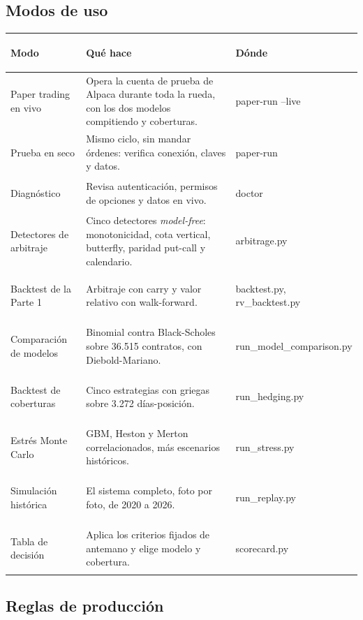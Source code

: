 \documentclass[11pt,a4paper]{article}
\begin{document}
\subsection{Modos de uso}

\begin{center}
\small
\begin{tabularx}{\linewidth}{@{}>{\sffamily\bfseries\raggedright\arraybackslash\leavevmode\color{navy}}p{3.2cm}X>{\ttfamily\scriptsize}p{4.2cm}@{}}
\toprule
\normalfont\sffamily\bfseries Modo & \sffamily\bfseries Qué hace & \normalfont\sffamily\bfseries Dónde \\
\midrule
Paper trading en vivo & Opera la cuenta de prueba de Alpaca durante toda la rueda, con los dos modelos compitiendo y coberturas. & paper-run --live \\
Prueba en seco & Mismo ciclo, sin mandar órdenes: verifica conexión, claves y datos. & paper-run \\
Diagnóstico & Revisa autenticación, permisos de opciones y datos en vivo. & doctor \\
Detectores de arbitraje & Cinco detectores \emph{model-free}: monotonicidad, cota vertical, butterfly, paridad put-call y calendario. & arbitrage.py \\
Backtest de la Parte 1 & Arbitraje con carry y valor relativo con walk-forward. & backtest.py, rv\_backtest.py \\
Comparación de modelos & Binomial contra Black-Scholes sobre 36.515 contratos, con Diebold-Mariano. & run\_model\_comparison.py \\
Backtest de coberturas & Cinco estrategias con griegas sobre 3.272 días-posición. & run\_hedging.py \\
Estrés Monte Carlo & GBM, Heston y Merton correlacionados, más escenarios históricos. & run\_stress.py \\
Simulación histórica & El sistema completo, foto por foto, de 2020 a 2026. & run\_replay.py \\
Tabla de decisión & Aplica los criterios fijados de antemano y elige modelo y cobertura. & scorecard.py \\
\bottomrule
\end{tabularx}
\end{center}

\subsection{Reglas de producción}
\end{document}
